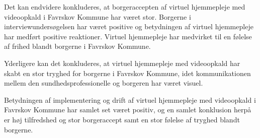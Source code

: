 Det kan endvidere konkluderes, at borgeraccepten af virtuel hjemmepleje med videoopkald i Favrskov Kommune har været stor. Borgerne i interviewundersøgelsen har været positive og betydningen af virtuel hjemmepleje har medført positive reaktioner. Virtuel hjemmepleje har medvirket til en følelse af frihed blandt borgerne i Favrskov Kommune.

Yderligere kan det konkluderes, at virtuel hjemmepleje med videoopkald har skabt en stor tryghed for borgerne i Favrskov Kommune, idet kommunikationen mellem den sundhedsprofessionelle og borgeren har været visuel. 

Betydningen af implementering og drift af virtuel hjemmepleje med videoopkald i Favrskov Kommune har samlet set været positiv, og en samlet konklusion herpå er høj tilfredshed og stor borgeraccept samt en stor følelse af tryghed blandt borgerne. 












